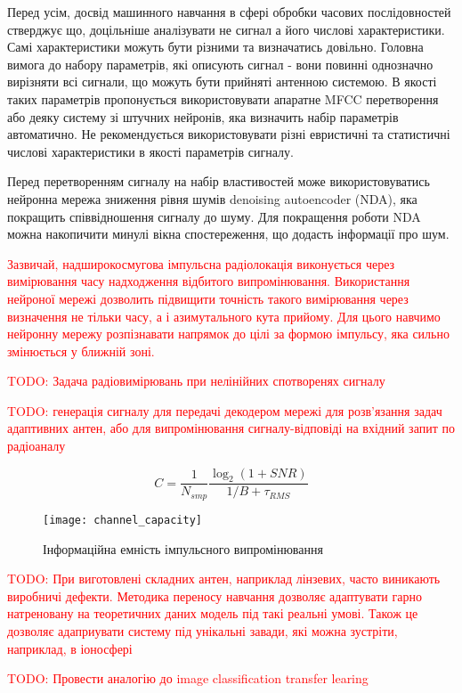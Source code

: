 Перед усім, досвід машинного навчання в сфері обробки часових послідовностей 
стверджує що, доцільніше аналізувати не сигнал а його числові характеристики. 
Самі характеристики можуть бути різними та визначатись довільно. 
Головна вимога до набору параметрів, які описують сигнал - вони повинні 
однозначно вирізняти всі сигнали, що можуть бути прийняті антенною 
системою. В якості таких параметрів пропонується використовувати апаратне 
MFCC перетворення або деяку систему зі штучних нейронів, яка визначить набір 
параметрів автоматично. Не рекомендується використовувати різні евристичні та 
статистичні числові характеристики в якості параметрів сигналу.

Перед перетворенням сигналу на набір властивостей може використовуватись 
нейронна мережа зниження рівня шумів denoising autoencoder (NDA), 
яка покращить співвідношення сигналу до шуму. Для покращення роботи 
NDA можна накопичити минулі вікна спостереження, що додасть 
інформації про шум.

\textcolor{red}{Зазвичай, надширокосмугова імпульсна радіолокація виконується 
через вимірювання часу надходження відбитого випромінювання. Використання 
нейроної мережі дозволить підвищити точність такого вимірювання через 
визначення не тільки часу, а і азимутального кута прийому. Для цього навчимо 
нейронну мережу розпізнавати напрямок до цілі за формою імпульсу, яка сильно 
змінюється у ближній зоні.}

\textcolor{red}{TODO: Задача радіовимірювань при нелінійних спотворенях сигналу}

\textcolor{red}{TODO: генерація сигналу для передачі декодером мережі для 
розв'язання задач адаптивних антен, або для випромінювання сигналу-відповіді 
на вхідний запит по радіоаналу}

\begin{equation}
C = \frac{1}{N_{smp}} \frac{\log_2 \left( 1 + SNR \right)}{1/B + \tau_{RMS}} 
\end{equation}

\begin{figure}[htbp] \begin{center}
\texttt{[image: channel\_capacity]}
\caption{Інформаційна емність імпульсного випромінювання} \label{fig:info_cap}
\end{center} \end{figure}

\textcolor{red}{TODO: При виготовлені складних антен, наприклад лінзевих, часто
виникають виробничі дефекти. Методика переносу навчання дозволяє адаптувати 
гарно натреновану на теоретичних даних модель під такі реальні умові. Також
це дозволяє адаприувати систему під унікальні завади, які можна зустріти,
наприклад, в іоносфері }

\textcolor{red}{TODO: Провести аналогію до image classification transfer 
learing}
